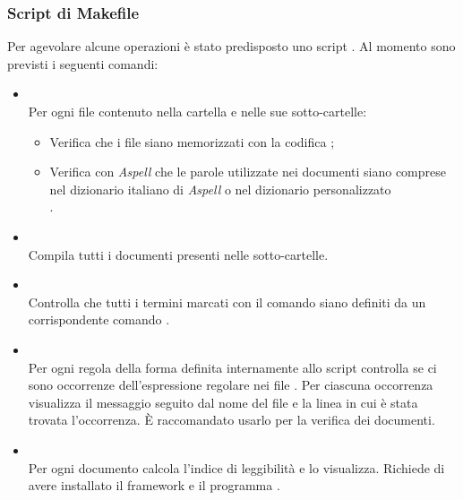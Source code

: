 
		\subsubsection{Script di Makefile}
		\label{makefile}

Per agevolare alcune operazioni è stato predisposto uno script . Al momento sono previsti i seguenti comandi:
\begin{itemize}

\item \textbf{} \\
Per ogni file  contenuto nella cartella e nelle sue sotto-cartelle:
\begin{itemize}
	\item Verifica che i file siano memorizzati con la codifica ;
	\item Verifica con \emph{Aspell} che le parole utilizzate nei documenti siano comprese nel dizionario italiano di \emph{Aspell} o nel dizionario personalizzato \\
	.
\end{itemize}
	
\item \textbf{} \\
Compila tutti i documenti presenti nelle sotto-cartelle.

\item \textbf{} \\
Controlla che tutti i termini marcati con il comando \code{\\glossario\{\dots\}} siano definiti da un corrispondente comando .

\item \textbf{} \\
Per ogni regola della forma  definita internamente allo script controlla se ci sono occorrenze dell'espressione regolare  nei file . Per ciascuna occorrenza visualizza il messaggio  seguito dal nome del file e la linea in cui è stata trovata l'occorrenza. È raccomandato usarlo per la verifica dei documenti.

\item \textbf{} \\
Per ogni documento  calcola l'indice di leggibilità  e lo visualizza. Richiede di avere installato il framework  e il programma .

\end{itemize}

